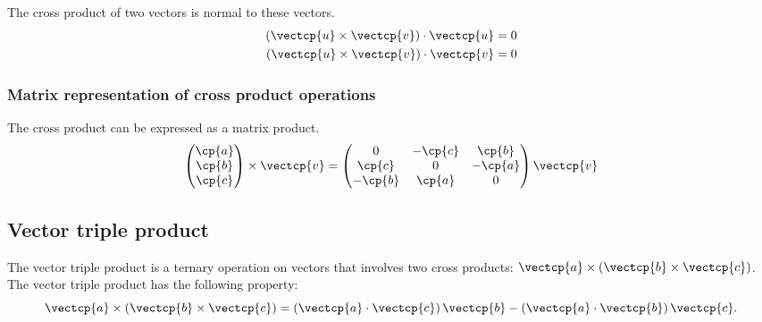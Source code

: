 \begin{refsection}
    The cross product of two vectors is normal to these vectors.
\begin{subequations}
    \begin{align}
        (\vectcp{u} \times \vectcp{v}) \cdot \vectcp{u} &= 0
        \\
        (\vectcp{u} \times \vectcp{v}) \cdot \vectcp{v} &= 0
    \end{align}
\end{subequations}

\subsubsection{Matrix representation of cross product operations}
The cross product can be expressed as a matrix product.
\begin{equation}
    \begin{pmatrix}
        \cp{a} \\ \cp{b} \\ \cp{c}
    \end{pmatrix}
    \times
    \vectcp{v}
    =
    \begin{pmatrix}
        0 & -\cp{c} & \cp{b} \\
        \cp{c} & 0 & -\cp{a} \\
        -\cp{b} & \cp{a} & 0
    \end{pmatrix}
    \vectcp{v}
    \label{eq:cross_product_matrix}
\end{equation}





\subsection{Vector triple product}

The vector triple product is a ternary operation on vectors that involves two cross products: $\vectcp{a} \times (\vectcp{b} \times \vectcp{c})$.
The vector triple product has the following property:
\begin{equation}
    \vectcp{a} \times \left(\vectcp{b} \times \vectcp{c}\right)
    =
    \left(\vectcp{a} \cdot \vectcp{c}\right) \vectcp{b}
    -
    \left(\vectcp{a} \cdot \vectcp{b}\right) \vectcp{c}
    \text{.}
    \label{eq:vector_triple_product}
\end{equation}


\end{refsection}

